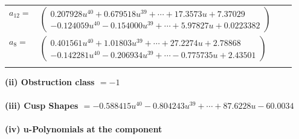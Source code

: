 \documentclass[1p]{elsarticle_modified}
\theoremstyle{definition}
\begin{document}
\begin{tabular}{m{7pt} m{180pt} m{7pt} m{180pt} }
\flushright $a_{12}=$&$\begin{pmatrix}0.207928 u^{40}+0.679518 u^{39}+\cdots+17.3573 u+7.37029\\-0.124059 u^{40}-0.154000 u^{39}+\cdots+5.97827 u+0.0223382\end{pmatrix}$ \\
\flushright $a_{8}=$&$\begin{pmatrix}0.401561 u^{40}+1.01803 u^{39}+\cdots+27.2274 u+2.78868\\-0.142281 u^{40}-0.206934 u^{39}+\cdots-0.775735 u+2.43501\end{pmatrix}$\\&\end{tabular}
\flushleft \textbf{(ii) Obstruction class $= -1$}\\~\\
\flushleft \textbf{(iii) Cusp Shapes $= -0.588415 u^{40}-0.804243 u^{39}+\cdots+87.6228 u-60.0034$}\\~\\
\newpage\renewcommand{\arraystretch}{1}
\flushleft \textbf{(iv) u-Polynomials at the component}\newline \\
\end{document}
